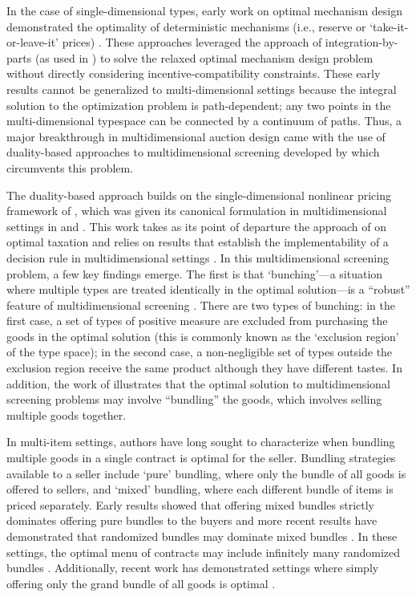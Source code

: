 \documentclass{article}
\begin{document}
In the case of single-dimensional types, early work on optimal mechanism design demonstrated the optimality of deterministic mechanisms (i.e., reserve or `take-it-or-leave-it' prices) \autocite{myerson1981optimal,riley1983}. These approaches leveraged the approach of integration-by-parts (as used in \cite{mussa1978}) to solve the relaxed optimal mechanism design problem without directly considering incentive-compatibility constraints. These early results cannot be generalized to multi-dimensional settings because the integral solution to the optimization problem is path-dependent; any two points in the multi-dimensional typespace can be connected by a continuum of paths. Thus, a major breakthrough in multidimensional auction design came with the use of duality-based approaches to multidimensional screening developed by \autocite{rochet1998ironing} which circumvents this problem.

The duality-based approach \autocite{rochet1998ironing} builds on the single-dimensional nonlinear pricing framework of \autocite{mussa1978}, which was given its canonical formulation in multidimensional settings in \autocite{wilson1993nonlinear} and \autocite{armstrong1996multiproduct}. This work takes as its point of departure the approach of \autocite{mirrlees1971} on optimal taxation and relies on results that establish the implementability of a decision rule in multidimensional settings \autocite{rochet1987}. In this multidimensional screening problem, a few key findings emerge. The first is that `bunching'---a situation where multiple types are treated identically in the optimal solution---is a ``robust'' feature of multidimensional screening \autocite{rochetstole2003,rochet1998ironing}. There are two types of bunching: in the first case, a set of types of positive measure are excluded from purchasing the goods in the optimal solution (this is commonly known as the `exclusion region' of the type space); in the second case, a non-negligible set of types outside the exclusion region receive the same product although they have different tastes. In addition, the work of \autocite{rochet1998ironing} illustrates that the optimal solution to multidimensional screening problems may involve ``bundling'' the goods, which involves selling multiple goods together.

In multi-item settings, authors have long sought to characterize when bundling multiple goods in a single contract is optimal for the seller. Bundling strategies available to a seller include `pure' bundling, where only the bundle of all goods is offered to sellers, and `mixed' bundling, where each different bundle of items is priced separately. Early results showed that offering mixed bundles strictly dominates offering pure bundles to the buyers \autocite{adams1976,mcafee1989} and more recent results have demonstrated that randomized bundles may dominate mixed bundles \autocite{thanassoulis2004,daskalakis2017strong}. In these settings, the optimal menu of contracts may include infinitely many randomized bundles \autocite{manelli2007multidimensional,hart2019}. Additionally, recent work has demonstrated settings where simply offering only the grand bundle of all goods is optimal \autocite{haghpanah2021}.
\end{document}
